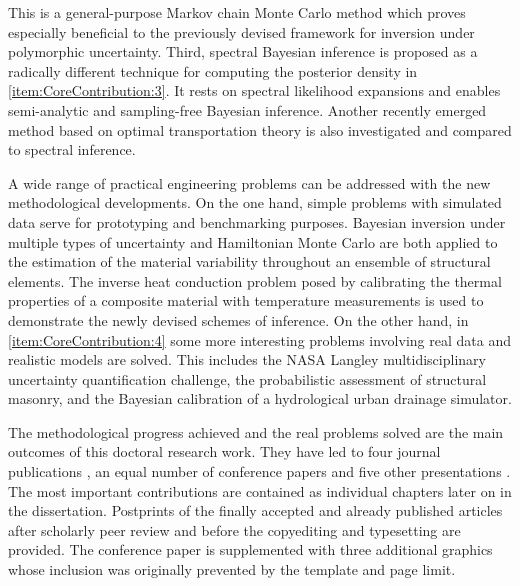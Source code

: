 \begin{refsection}
This is a general-purpose Markov chain Monte Carlo method which proves especially beneficial to the previously devised framework for inversion under polymorphic uncertainty.
Third, spectral Bayesian inference is proposed as a radically different technique for computing the posterior density in \ref{item:CoreContribution:3}.
It rests on spectral likelihood expansions and enables semi-analytic and sampling-free Bayesian inference.
Another recently emerged method based on optimal transportation theory is also investigated and compared to spectral inference.
\par %
A wide range of practical engineering problems can be addressed with the new methodological developments.
On the one hand, simple problems with simulated data serve for prototyping and benchmarking purposes.
Bayesian inversion under multiple types of uncertainty and Hamiltonian Monte Carlo are both applied to the estimation of the material variability throughout an ensemble of structural elements.
The inverse heat conduction problem posed by calibrating the thermal properties of a composite material with temperature measurements is used to demonstrate the newly devised schemes of inference.
On the other hand, in \ref{item:CoreContribution:4} some more interesting problems involving real data and realistic models are solved.
This includes the NASA Langley multidisciplinary uncertainty quantification challenge, the probabilistic assessment of structural masonry,
and the Bayesian calibration of a hydrological urban drainage simulator.
\par %
The methodological progress achieved and the real problems solved are the main outcomes of this doctoral research work.
They have led to four journal publications \cite{Nagel:JAIS2015,Nagel:PEM2016,Nagel:JRUES2016,Nagel:JCP2016},
an equal number of conference papers \cite{Nagel:IPW2013:Proc,Nagel:SciTech2014:Proc,Nagel:ICVRAM2014:Proc,Nagel:ICASP2015:Proc}
and five other presentations \cite{Nagel:MascotNum2014:Pres,Nagel:PANACM2015:Pres,Nagel:SRES2015:Pres,Nagel:SIAMUQ2016:Pres,Nagel:ECCOMAS2016:Pres}.
The most important contributions \cite{Nagel:JAIS2015,Nagel:PEM2016,Nagel:JRUES2016,Nagel:JCP2016,Nagel:ICASP2015:Proc} are contained as individual chapters later on in the dissertation.
Postprints of the finally accepted and already published articles \cite{Nagel:JAIS2015,Nagel:PEM2016,Nagel:JRUES2016,Nagel:JCP2016}
after scholarly peer review and before the copyediting and typesetting are provided.
The conference paper \cite{Nagel:ICASP2015:Proc} is supplemented with three additional graphics whose inclusion was originally prevented by the template and page limit.
\printbibliography[heading=subsubbibliography,title={Journal papers},type=article]
\printbibliography[heading=subsubbibliography,title={Conference proceedings},type=incollection]
\printbibliography[heading=subsubbibliography,title={Other presentations},type=inproceedings]


\end{refsection}

